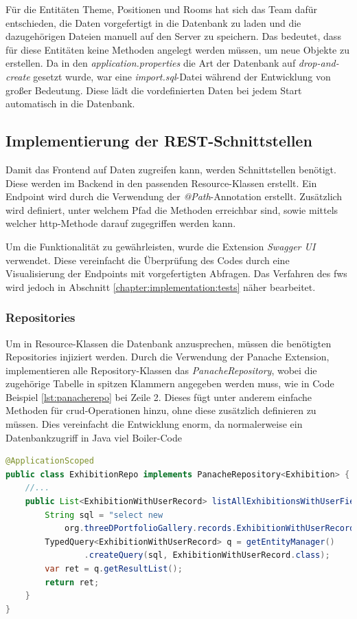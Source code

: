 Für die Entitäten Theme, Positionen und Rooms hat sich das Team dafür entschieden, die Daten vorgefertigt in die Datenbank zu laden und die dazugehörigen Dateien manuell auf den Server zu speichern. 
Das bedeutet, dass für diese Entitäten keine Methoden angelegt werden müssen, um neue Objekte zu erstellen. 
Da in den \emph{application.properties} die Art der Datenbank auf \emph{drop-and-create} gesetzt wurde, war eine \emph{import.sql}-Datei während der Entwicklung von großer Bedeutung. 
Diese lädt die vordefinierten Daten bei jedem Start automatisch in die Datenbank. 

\subsection{Implementierung der REST-Schnittstellen}

Damit das Frontend auf Daten zugreifen kann, werden Schnittstellen benötigt. 
Diese werden im Backend in den passenden Resource-Klassen erstellt. 
Ein Endpoint wird durch die Verwendung der \emph{@Path}-Annotation erstellt.
Zusätzlich wird definiert, unter welchem Pfad die Methoden erreichbar sind, sowie mittels welcher \gls{http}-Methode darauf zugegriffen werden kann. 

Um die Funktionalität zu gewährleisten, wurde die Extension \emph{Swagger UI} verwendet. 
Diese vereinfacht die Überprüfung des Codes durch eine Visualisierung der Endpoints mit vorgefertigten Abfragen. 
Das Verfahren des \gls{fw}s wird jedoch in Abschnitt \ref{chapter:implementation:tests} näher bearbeitet. 

\subsubsection{Repositories} 

Um in Resource-Klassen die Datenbank anzusprechen, müssen die benötigten Repositories injiziert werden. 
Durch die Verwendung der Panache Extension, implementieren alle Repository-Klassen das \emph{PanacheRepository}, wobei die zugehörige Tabelle in spitzen Klammern angegeben werden muss, wie in Code Beispiel \ref{lst:panacherepo} bei Zeile 2.
Dieses fügt unter anderem einfache Methoden für \gls{crud}-Operationen hinzu, ohne diese zusätzlich definieren zu müssen. 
Dies vereinfacht die Entwicklung enorm, da normalerweise ein Datenbankzugriff in Java viel Boiler-Code 

\begin{lstlisting}[label=lst:panacherepo, language=Java, caption=Teil aus dem Exhibition Repository]
@ApplicationScoped
public class ExhibitionRepo implements PanacheRepository<Exhibition> {
    //...
    public List<ExhibitionWithUserRecord> listAllExhibitionsWithUserField() {
        String sql = "select new 
            org.threeDPortfolioGallery.records.ExhibitionWithUserRecord(e, u.user_name, u.icon_url) from Exhibition e join e.user u left join e.categories c";
        TypedQuery<ExhibitionWithUserRecord> q = getEntityManager()
                .createQuery(sql, ExhibitionWithUserRecord.class);
        var ret = q.getResultList();
        return ret;
    }
}
\end{lstlisting}

